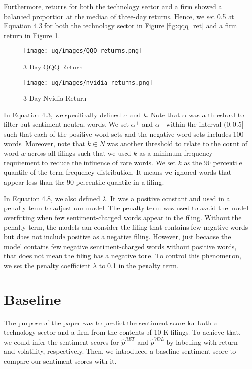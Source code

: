 \documentclass[logo,bsc,singlespacing,parskip]{infthesis}
\begin{document}
Furthermore, returns for both the technology sector and a firm showed a balanced proportion at the median of three-day returns. Hence, we set 0.5 at \hyperref[4.3]{Equation 4.3} for both the technology sector in Figure \ref{fig:qqq_ret} and a firm return in Figure \ref{fig:nvidia_ret}. 

\begin{figure}[ht]
  \centering
  \begin{minipage}{0.5\textwidth}
    \centering
    \texttt{[image: ug/images/QQQ\_returns.png]} %
    \caption{3-Day QQQ Return}
    \label{fig:qqq_ret}
  \end{minipage}%
  \begin{minipage}{0.5\textwidth}
    \centering
    \texttt{[image: ug/images/nvidia\_returns.png]} %
    \caption{3-Day Nvidia Return}
    \label{fig:nvidia_ret}
  \end{minipage}
\end{figure}

In \hyperref[4.3]{Equation 4.3}, we specifically defined $\alpha$  and $k$. Note that $\alpha$ was a threshold to filter out sentiment-neutral words. We set $\alpha^{+}$ and $\alpha^{-}$ within the interval $(0,0.5]$ such that each of the positive word sets and the negative word sets includes 100 words. Moreover, note that $k \in N$ was another threshold to relate to the count of word $w$ across all filings such that we used $k$ as a minimum frequency requirement to reduce the influence of rare words. We set $k$ as the 90 percentile quantile of the term frequency distribution. It means we ignored words that appear less than the 90 percentile quantile in a filing. 

In \hyperref[4.8]{Equation 4.8}, we also defined $\lambda$. It was a positive constant and used in a penalty term to adjust our model. The penalty term was used to avoid the model overfitting when few sentiment-charged words appear in the filing. Without the penalty term, the models can consider the filing that contains few negative words but does not include positive as a negative filing. However, 
just because the model contains few negative sentiment-charged words without positive words, that does not mean the filing has a negative tone. To control this phenomenon, we set the penalty coefficient $\lambda$ to 0.1 in the penalty term.

\section{Baseline}
The purpose of the paper was to predict the sentiment score for both a technology sector and a firm from the contents of 10-K filings. To achieve that, we could infer the sentiment scores for $\hat{p}^{RET}$ and $\hat{p}^{VOL}$ by labelling with return and volatility, respectively. Then, we introduced a baseline sentiment score to compare our sentiment scores with it. 
\end{document}
